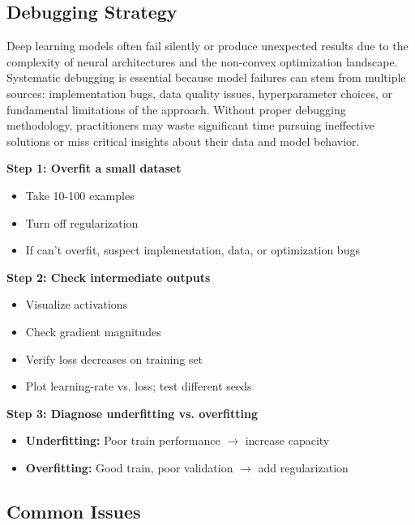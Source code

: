 \subsection{Debugging Strategy}

Deep learning models often fail silently or produce unexpected results due to the complexity of neural architectures and the non-convex optimization landscape. Systematic debugging is essential because model failures can stem from multiple sources: implementation bugs, data quality issues, hyperparameter choices, or fundamental limitations of the approach. Without proper debugging methodology, practitioners may waste significant time pursuing ineffective solutions or miss critical insights about their data and model behavior.


\textbf{Step 1: Overfit a small dataset}
\begin{itemize}
    \item Take 10-100 examples
    \item Turn off regularization
    \item If can't overfit, suspect implementation, data, or optimization bugs
\end{itemize}

\textbf{Step 2: Check intermediate outputs}
\begin{itemize}
    \item Visualize activations
    \item Check gradient magnitudes
    \item Verify loss decreases on training set
    \item Plot learning-rate vs. loss; test different seeds
\end{itemize}

\textbf{Step 3: Diagnose underfitting vs. overfitting}
\begin{itemize}
    \item \textbf{Underfitting:} Poor train performance $\to$ increase capacity
    \item \textbf{Overfitting:} Good train, poor validation $\to$ add regularization
\end{itemize}

\subsection{Common Issues}

